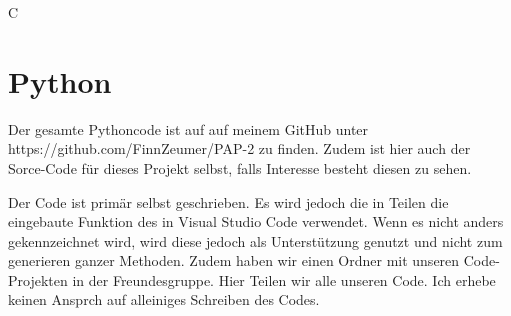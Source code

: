 C\chapter{Python}
\label{ch:Python}


Der gesamte Pythoncode ist auf auf meinem GitHub unter https://github.com/FinnZeumer/PAP-2 \cite{githubPAP2} zu finden. Zudem ist hier auch der Sorce-Code für dieses Projekt selbst, falls Interesse besteht diesen zu sehen.

Der Code ist primär selbst geschrieben. Es wird jedoch die in Teilen die eingebaute Funktion des  in Visual Studio Code verwendet. Wenn es nicht anders gekennzeichnet wird, wird diese jedoch als Unterstützung genutzt und nicht zum generieren ganzer Methoden. 
Zudem haben wir einen Ordner mit unseren Code-Projekten in der Freundesgruppe. Hier Teilen wir alle unseren Code. Ich erhebe keinen Ansprch auf alleiniges Schreiben des Codes.



